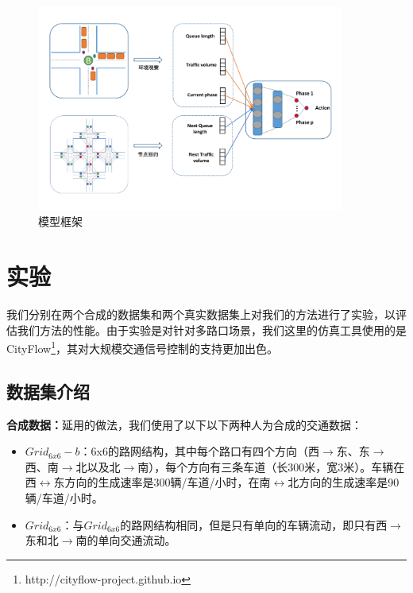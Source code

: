 \begin{figure}[htb]
  \includegraphics[width=0.9\textwidth]{fig/model-framework.pdf}
  \caption{模型框架}
  \label{fig:model-framework}
\end{figure}
\section{实验}
我们分别在两个合成的数据集和两个真实数据集上对我们的方法进行了实验，以评估我们方法的性能。由于实验是对针对多路口场景，我们这里的仿真工具使用的是CityFlow\footnote{http://cityflow-project.github.io}，其对大规模交通信号控制的支持更加出色。
\subsection{数据集介绍}
\textbf{合成数据：}延用的做法，我们使用了以下以下两种人为合成的交通数据：
\begin{itemize}
  \item $Grid_{6x6}-b$：6x6的路网结构，其中每个路口有四个方向（西$\rightarrow$东、东$\rightarrow$西、南$\rightarrow$北以及北$\rightarrow$南），每个方向有三条车道（长300米，宽3米）。车辆在西$\leftrightarrow$东方向的生成速率是300辆/车道/小时，在南$\leftrightarrow$北方向的生成速率是90辆/车道/小时。
  \item $Grid_{6x6}$：与$Grid_{6x6}$的路网结构相同，但是只有单向的车辆流动，即只有西$\rightarrow$东和北$\rightarrow$南的单向交通流动。
\end{itemize}

